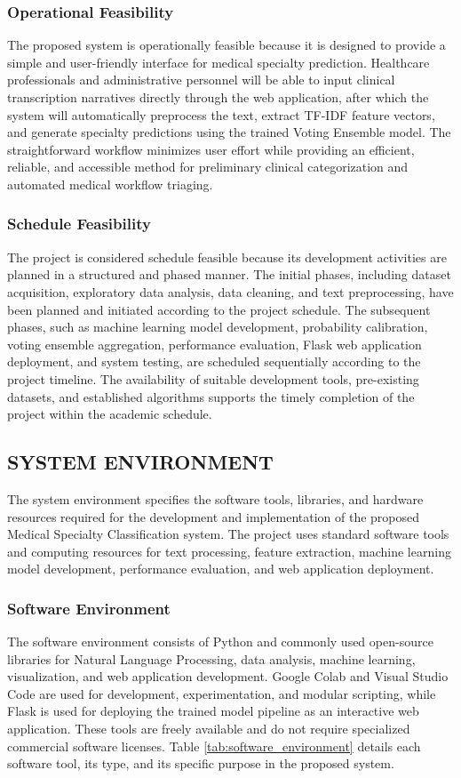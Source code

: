 \subsubsection{Operational Feasibility}
The proposed system is operationally feasible because it is designed to provide a simple and user-friendly interface for medical specialty prediction. Healthcare professionals and administrative personnel will be able to input clinical transcription narratives directly through the web application, after which the system will automatically preprocess the text, extract TF-IDF feature vectors, and generate specialty predictions using the trained Voting Ensemble model. The straightforward workflow minimizes user effort while providing an efficient, reliable, and accessible method for preliminary clinical categorization and automated medical workflow triaging.

\subsubsection{Schedule Feasibility}
The project is considered schedule feasible because its development activities are planned in a structured and phased manner. The initial phases, including dataset acquisition, exploratory data analysis, data cleaning, and text preprocessing, have been planned and initiated according to the project schedule. The subsequent phases, such as machine learning model development, probability calibration, voting ensemble aggregation, performance evaluation, Flask web application deployment, and system testing, are scheduled sequentially according to the project timeline. The availability of suitable development tools, pre-existing datasets, and established algorithms supports the timely completion of the project within the academic schedule.

\subsection{SYSTEM ENVIRONMENT}
The system environment specifies the software tools, libraries, and hardware resources required for the development and implementation of the proposed Medical Specialty Classification system. The project uses standard software tools and computing resources for text processing, feature extraction, machine learning model development, performance evaluation, and web application deployment.

\subsubsection{Software Environment}
The software environment consists of Python and commonly used open-source libraries for Natural Language Processing, data analysis, machine learning, visualization, and web application development. Google Colab and Visual Studio Code are used for development, experimentation, and modular scripting, while Flask is used for deploying the trained model pipeline as an interactive web application. These tools are freely available and do not require specialized commercial software licenses. Table \ref{tab:software_environment} details each software tool, its type, and its specific purpose in the proposed system.


